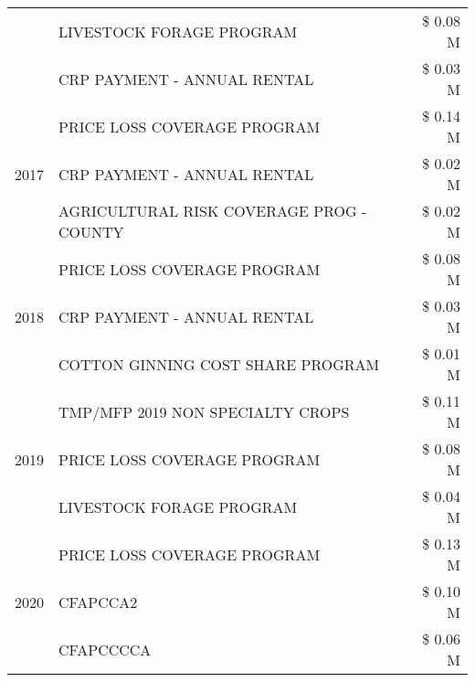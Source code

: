 \begin{tabular}{llr}
 & LIVESTOCK FORAGE PROGRAM                      & \$ 0.08 M \\
 & CRP PAYMENT - ANNUAL RENTAL                   & \$ 0.03 M \\
\cline{1-3}
\multirow[t]{3}{*}{2017} & PRICE LOSS COVERAGE PROGRAM & \$ 0.14 M \\
 & CRP PAYMENT - ANNUAL RENTAL & \$ 0.02 M \\
 & AGRICULTURAL RISK COVERAGE PROG - COUNTY & \$ 0.02 M \\
\cline{1-3}
\multirow[t]{3}{*}{2018} & PRICE LOSS COVERAGE PROGRAM & \$ 0.08 M \\
 & CRP PAYMENT - ANNUAL RENTAL & \$ 0.03 M \\
 & COTTON GINNING COST SHARE PROGRAM & \$ 0.01 M \\
\cline{1-3}
\multirow[t]{3}{*}{2019} & TMP/MFP 2019 NON SPECIALTY CROPS & \$ 0.11 M \\
 & PRICE LOSS COVERAGE PROGRAM & \$ 0.08 M \\
 & LIVESTOCK FORAGE PROGRAM & \$ 0.04 M \\
\cline{1-3}
\multirow[t]{3}{*}{2020} & PRICE LOSS COVERAGE PROGRAM & \$ 0.13 M \\
 & CFAPCCA2 & \$ 0.10 M \\
 & CFAPCCCCA & \$ 0.06 M \\
\cline{1-3}
\bottomrule
\end{tabular}
